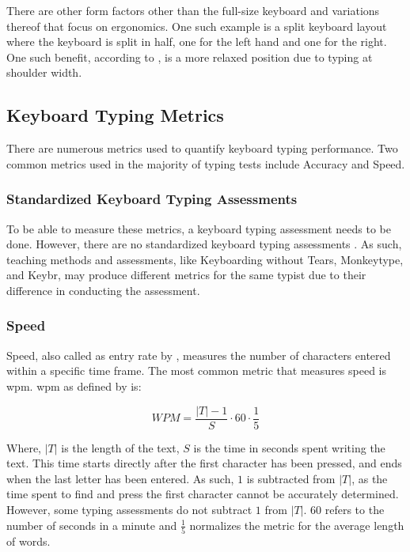 \documentclass{report}
\newcommand{\labelequations}[1]{%
	\addcontentsline{equ}{equations}{\numberline{\theequation}#1}\par}
\begin{document}
There are other form factors other than the full-size keyboard and variations
thereof that focus on ergonomics. One such example is a split keyboard layout
where the keyboard is split in half, one for the left hand and one for the
right. One such benefit, according to \citeauthor{ergodox}, is a more relaxed
position due to typing at shoulder width.

\subsection{Keyboard Typing Metrics}

There are numerous metrics used to quantify keyboard typing performance. Two
common metrics used in the majority of typing tests include Accuracy and Speed.

\subsubsection{Standardized Keyboard Typing Assessments}

To be able to measure these metrics, a keyboard typing assessment needs to be
done. However, there are no standardized keyboard typing assessments
\parencite{donica2018}. As such, teaching methods and assessments, like
Keyboarding without Tears, Monkeytype, and Keybr, may produce different metrics
for the same typist due to their difference in conducting the assessment.

\subsubsection{Speed}
Speed, also called as entry rate by \citeauthor{arif2009}, measures the number
of characters entered within a specific time frame. The most common metric that
measures speed is \ac{wpm}. \ac{wpm} as defined by \citeauthor{arif2009} is:

\begin{equation}
	WPM = \frac{|T| - 1}{S} \cdot 60 \cdot \frac{1}{5}
	\label{equ:wpm}
\end{equation}
\labelequations{Words per Minute}

Where, $|T|$ is the length of the text, $S$ is the time in seconds spent writing
the text. This time starts directly after the first character has been pressed,
and ends when the last letter has been entered. As such, $1$ is subtracted from
$|T|$, as the time spent to find and press the first character cannot be
accurately determined. However, some typing assessments do not subtract $1$ from
$|T|$. $60$ refers to the number of seconds in a minute and $\frac{1}{5}$
normalizes the metric for the average length of words.
\end{document}
